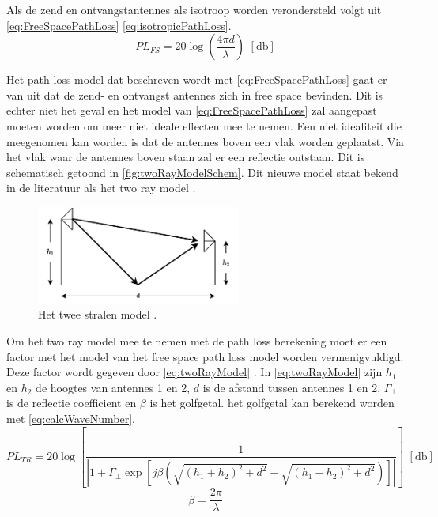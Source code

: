 Als de zend en ontvangstantennes als isotroop worden verondersteld volgt uit \autoref{eq:FreeSpacePathLoss} \autoref{eq:isotropicPathLoss}.
\begin{equation} \label{eq:isotropicPathLoss}
    PL_{FS}=20\log\left(\frac{4\pi d}{\lambda}\right) \,\,\left[\unit{\decibel}\right]
\end{equation}

Het path loss model dat beschreven wordt met \autoref{eq:FreeSpacePathLoss} gaat er van uit dat de zend- en ontvangst antennes zich in free space bevinden. Dit is echter niet het geval en het model van \autoref{eq:FreeSpacePathLoss} zal aangepast moeten worden om meer niet ideale effecten mee te nemen. Een niet idealiteit die meegenomen kan worden is dat de antennes boven een vlak worden geplaatst. Via het vlak waar de antennes boven staan zal er een reflectie ontstaan. Dit is schematisch getoond in \autoref{fig:twoRayModelSchem}. Dit nieuwe model staat bekend in de literatuur als het two ray model \cite{MobileAntenaSystemsHandbookCH2}.
\begin{figure}[h]
    \centering
    \includegraphics[width=0.6\textwidth]{img/twoRayModel}
    \caption{Het twee stralen model \cite{MobileAntenaSystemsHandbookCH2}.}
    \label{fig:twoRayModelSchem}
\end{figure}

Om het two ray model mee te nemen met de path loss berekening moet er een factor met het model van het free space path loss model worden vermenigvuldigd. Deze factor wordt gegeven door \autoref{eq:twoRayModel} \cite{MobileAntenaSystemsHandbookCH2,brini2019system}. In \autoref{eq:twoRayModel} zijn $h_1$ en $h_2$ de hoogtes van antennes 1 en 2, $d$ is de afstand tussen antennes 1 en 2, $\Gamma_\bot$ is de reflectie coefficient en $\beta$ is het golfgetal. het golfgetal kan berekend worden met \autoref{eq:calcWaveNumber}. 
\begin{equation}\label{eq:twoRayModel}
    PL_{TR}=20\log\left[\frac{1}{\left|1+\Gamma_\bot\exp\left[j\beta \left(\sqrt{\left(h_1+h_2\right)^2+d^2}-\sqrt{\left(h_1-h_2\right)^2+d^2}\right)\right]\right|}\right] \,\,\left[\unit{\decibel}\right]
\end{equation}
\begin{equation}\label{eq:calcWaveNumber}
    \beta=\frac{2\pi}{\lambda}
\end{equation}

